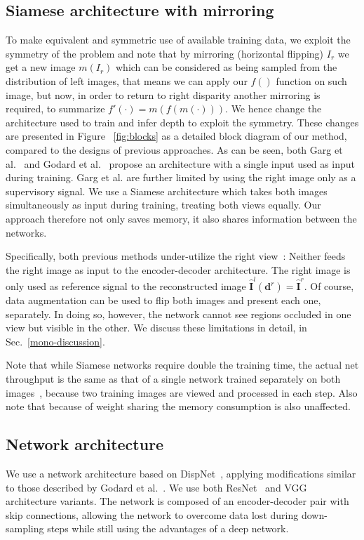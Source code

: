 \documentclass[10pt,twocolumn,letterpaper]{article}
\begin{document}
\subsection{Siamese architecture with mirroring}
To make equivalent and symmetric use of available training data, we exploit the symmetry of the problem and note that by mirroring (horizontal flipping) $I_r$ we get a new image $m(I_r)$ which can be considered as being sampled from the distribution of left images, that means we can apply our $f()$ function on such image, but now, in order to return to right disparity another mirroring is required, to summarize $f'(\cdot) = m(f(m(\cdot)))$. We hence change the architecture used to train and infer depth to exploit the symmetry. These changes are presented in Figure ~\ref{fig:blocks} as a detailed block diagram of our method, compared to the designs of previous approaches. As can be seen, both Garg et al.~\cite{garg2016unsupervised} and Godard et al.~\cite{monodepth17} propose an architecture with a single input used as input during training. Garg et al. are further limited by using the right image only as a supervisory signal. We use a Siamese architecture which takes both images simultaneously as input during training, treating both views equally. Our approach therefore not only saves memory, it also shares information between the networks.

Specifically, both previous methods under-utilize the right view~\cite{garg2016unsupervised,monodepth17}: Neither feeds the right image as input to the encoder-decoder architecture. The right image is only used as reference signal to the reconstructed image $\hat{\mathbf{I}}^l(\mathbf{d}^r) = \hat{\mathbf{I}}^r$. Of course, data augmentation can be used to flip both images and present each one, separately. In doing so, however, the network cannot see regions occluded in one view but visible in the other. We discuss these limitations in detail, in Sec.~\ref{mono-discussion}.

Note that while Siamese networks require double the training time, the actual net throughput is the same as that of a single network trained separately on both images~\cite{garg2016unsupervised,monodepth17}, because two training images are viewed and processed in each step. Also note that because of weight sharing the memory consumption is also unaffected.

\subsection{Network architecture}\label{sec:architecture}
We use a network architecture based on DispNet~\cite{MIFDB16}, applying modifications similar to those described by Godard et al.~\cite{monodepth17}. We use both ResNet~\cite{he2016deep} and VGG~\cite{simonyan2014very} architecture variants. The network is composed of an encoder-decoder pair with skip connections, allowing the network to overcome data lost during down-sampling steps while still using the advantages of a deep network.
\end{document}
